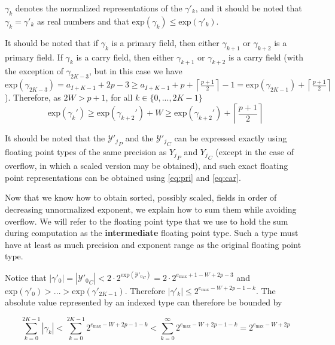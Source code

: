 \documentclass[12pt]{article}
\providecommand{\ceil}[1]{\left \lceil #1 \right \rceil }
\providecommand{\exp}{\ensuremath{\text{exp}}}
\providecommand{\max}{\ensuremath{\text{max}}}
\theoremstyle{definition}
\numberwithin{equation}{section}
\numberwithin{figure}{section}
\begin{document}
    $\gamma_k$ denotes the normalized representations of the $\gamma'_k$, and it should be noted that $\gamma_k = \gamma'_k$ as real numbers and that $\exp(\gamma_k) \leq \exp(\gamma'_k)$.

    It should be noted that if $\gamma_k$ is a primary field, then either $\gamma_{k + 1}$ or $\gamma_{k + 2}$ is a primary field. If $\gamma_k$ is a carry field, then either $\gamma_{k + 1}$ or $\gamma_{k + 2}$ is a carry field (with the exception of $\gamma_{2  K - 3}$, but in this case we have $\exp(\gamma_{2  K - 3}) = a_{I + K - 1} + 2  p - 3 \geq a_{I + K - 1} + p + \ceil{\frac{p + 1}{2}} - 1 = \exp(\gamma_{2  K - 1}) + \ceil{\frac{p + 1}{2}}$). Therefore, as $2  W > p + 1$, for all $k \in \{0, ..., 2  K - 1\}$
    \begin{equation}
      \exp(\gamma_k') \geq \exp(\gamma_{k + 2}') + W \geq \exp(\gamma_{k + 2}') + \ceil{\frac{p + 1}{2}}
      \label{eq:gammadecreasesfast}
    \end{equation}

    It should be noted that the ${\mathcal{Y}'_j}_P$ and the ${\mathcal{Y}'_j}_C$ can be expressed exactly using floating point types of the same precision as ${Y_j}_P$ and ${Y_j}_C$ (except in the case of overflow, in which a scaled version may be obtained), and such exact floating point representations can be obtained using  \eqref{eq:pri} and  \eqref{eq:car}.

    Now that we know how to obtain sorted, possibly scaled, fields in order of decreasing unnormalized exponent, we explain how to sum them while avoiding overflow. We will refer to the floating point type that we use to hold the sum during computation as the \textbf{intermediate} floating point type. Such a type must have at least as much precision and exponent range as the original floating point type.

    Notice that $|\gamma'_0| = |{\mathcal{Y}'_0}_C| < 2 \cdot 2^{\exp({\mathcal{Y}'_0}_C)} = 2 \cdot 2^{e_{\max} + 1 - W + 2  p - 3}$ and $\exp(\gamma'_0) > ... > \exp(\gamma'_{2  K - 1})$.  Therefore $|\gamma'_k| \leq 2^{e_{\max} - W + 2  p - 1 - k}$. The absolute value represented by an indexed type can therefore be bounded by

    \begin{equation}
      \label{eq:maxindexedvalue}
      \sum\limits_{k = 0}^{2  K - 1} |\gamma_k| < \sum\limits_{k = 0}^{2  K - 1} 2^{e_{\max} - W + 2  p - 1 - k} < \sum\limits_{k = 0}^{\infty} 2^{e_{\max} - W + 2  p - 1 - k} = 2^{e_{\max} - W + 2  p}
    \end{equation}
\end{document}
